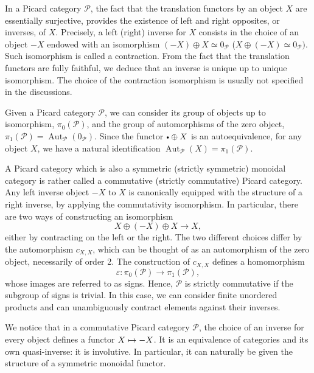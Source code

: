 \documentclass[JEP,XML,SOM,Unicode,published]{cedram}
\newcommand{\sbullet}{{\scriptscriptstyle\bullet}}
\newcommand{\csbullet}{{\raisebox{1pt}{$\sbullet$}}}
\newcommand\mto{\mathchoice{\longmapsto}{\mapsto}{\mapsto}{\mapsto}}
\theoremstyle{plain}
\theoremstyle{definition}
\newcommand{\Pcal}{\mathcal P}
\DeclareMathOperator{\Aut}{Aut}
\begin{document}
In a Picard category $\Pcal$, the fact that the translation functors by an object $X$ are essentially surjective, provides the existence of left and right opposites, or inverses, of $X$. Precisely, a left (\resp right) inverse for $X$ consists in the choice of an object $-X$ endowed with an isomorphism $(-X)\oplus X\simeq 0_{\Pcal}$ (\resp $X\oplus (-X)\simeq 0_{\Pcal})$. Such isomorphism is called a contraction. From the fact that the translation functors are fully faithful, we deduce that an inverse is unique up to unique isomorphism. The choice of the contraction isomorphism is usually not specified in the discussions.

Given a Picard category $\Pcal$, we can consider its group of objects up to isomorphism, $\pi_0(\Pcal)$, and the group of automorphisms of the zero object, $\pi_1(\Pcal) = \Aut_{\Pcal}(0_{\Pcal})$. Since the functor $\csbullet \oplus X$ is an autoequivalence, for any object $X$, we have a natural identification $\Aut_{\Pcal}(X) = \pi_1(\Pcal)$.

A Picard category which is also a symmetric (\resp strictly symmetric) monoidal category is rather called a commutative (\resp strictly commutative) Picard category. Any left inverse object $-X$ to $X$ is canonically equipped with the structure of a right inverse, by applying the commutativity isomorphism. In particular, there are two ways of constructing an isomorphism
\begin{displaymath}
X \oplus (-X) \oplus X \to X,
\end{displaymath}
either by contracting on the left or the right. The two different choices differ by the automorphism $c_{X,X}$, which can be thought of as an automorphism of the zero object, necessarily of order 2. The construction of $c_{X,X}$ defines a homomorphism
\begin{equation}\label{eq:isawthesign}
\varepsilon \colon \pi_0(\Pcal) \to \pi_1(\Pcal),
\end{equation}
whose images are referred to as signs. Hence, $\Pcal$ is strictly commutative if the subgroup of signs is trivial. In this case, we can consider finite unordered products and can unambiguously contract elements against their inverses.

We notice that in a commutative Picard category $\Pcal$, the choice of an inverse for every object defines a functor $X\mto -X$. It is an equivalence of categories and its own quasi-inverse: it is involutive. In particular, it can naturally be given the structure of a symmetric monoidal functor.
\end{document}
